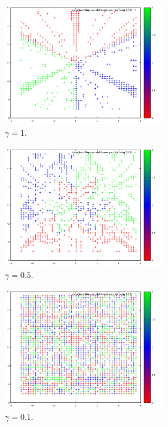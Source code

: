 \documentclass[
    oneside,
    ngerman,
    footinclude=false,
    captions=tableheading,
    DIV=12
]{scrartcl}
\begin{document}
    \begin{figure}[H]
        \begin{subfigure}[b]{0.49\textwidth}
            \centering
            \includegraphics[width=7cm]{../Simulation/img/Farbbild-g1.png}
            \caption{$\gamma = 1$.}
        \end{subfigure}
        \begin{subfigure}[b]{0.49\textwidth}
            \centering
            \includegraphics[width=7cm]{../Simulation/img/Farbbild-g05.png}
            \caption{$\gamma = 0.5$.}
        \end{subfigure}
        \begin{subfigure}[b]{0.49\textwidth}
            \centering
            \includegraphics[width=7cm]{../Simulation/img/Farbbild-g01.png}
            \caption{$\gamma = 0.1$.}
        \end{subfigure}
        \begin{subfigure}[b]{0.49\textwidth}
            \centering

\end{subfigure}
\end{figure}
\end{document}
